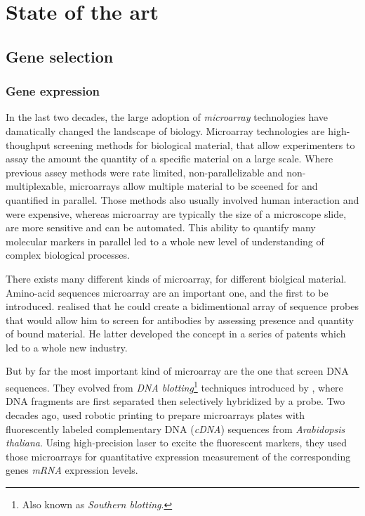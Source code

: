 \chapter{State of the art}
\label{chap:state}

\section{Gene selection}

	\subsection{Gene expression}

	In the last two decades, the large adoption of \emph{microarray} technologies have damatically changed the landscape of biology.
	Microarray technologies are high-thoughput screening methods for biological material, that allow experimenters to assay the amount the quantity of a specific material on a large scale.
	Where previous assey methods were rate limited, non-parallelizable and non-multiplexable, microarrays allow multiple material to be sceened for and quantified in parallel.
	Those methods also usually involved human interaction and were expensive, whereas microarray are typically the size of a microscope slide, are more sensitive and can be automated.
	This ability to quantify many molecular markers in parallel led to a whole new level of understanding of complex biological processes.

	There exists many different kinds of microarray, for different biolgical material.
	Amino-acid sequences microarray are an important one, and the first to be introduced.
	\Textcite{chang1983binding} realised that he could create a bidimentional array of sequence probes that would allow him to screen for antibodies by assessing presence and quantity of bound material.
	He latter developed the concept in a series of patents \parencites{chang1986matrix}{chang1989immunoassay}{chang1992antibody} which led to a whole new industry.

	But by far the most important kind of microarray are the one that screen DNA sequences.
	They evolved from \emph{DNA blotting}\footnote{Also known as \emph{Southern blotting}.} techniques introduced by \textcite{southern1975detection}, where DNA fragments are first separated then selectively hybridized by a probe.
	Two decades ago, \textcite{schena1995quantitative} used robotic printing to prepare microarrays plates with fluorescently labeled complementary DNA (\emph{cDNA}) sequences from \emph{Arabidopsis thaliana}.
	Using high-precision laser to excite the fluorescent markers, they used those microarrays for quantitative expression measurement of the corresponding genes \emph{mRNA} expression levels.


